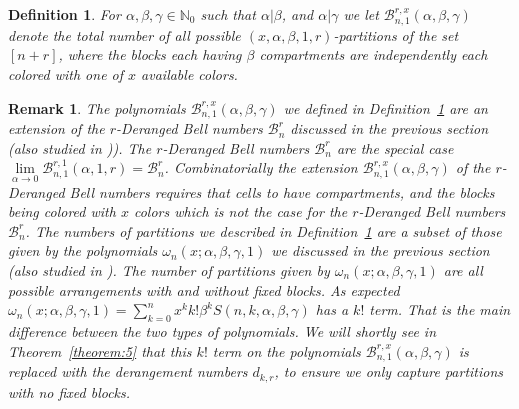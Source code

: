 \documentclass[12pt]{amsart}
\newtheorem{proof 1}{proof 1}
\newtheorem{remark}{Remark}[section]
\newtheorem{definition}{Definition}[section]
\begin{document}
\begin{definition}\label{definition:5}For $\alpha,\beta,\gamma\in\mathbb{N}_0$ such that $\alpha|\beta$, and $\alpha|\gamma$ we let $\mathcal{B}^{r,x}_{n,1}(\alpha,\beta,\gamma)$ denote the total number of all possible  $(x,\alpha,\beta,1,r)$-partitions of the set $[n+r]$, where the blocks 	each having $\beta$ compartments are independently each colored with one of $x$ available colors.  
\end{definition}
\begin{remark}The polynomials $\mathcal{B}^{r,x}_{n,1}(\alpha,\beta,\gamma)$ we defined in Definition~\ref{definition:5} are an extension of the $r$-Deranged Bell numbers $\mathcal{B}^{r}_{n}$ discussed in 
the previous section (also studied in \cite{belbachir2023deranged})). The $r$-Deranged Bell numbers $\mathcal{B}^{r}_{n}$ are the special case $\lim\limits_{\alpha\rightarrow0}\mathcal{B}^{r,1}_{n,1}(\alpha,1,r)=\mathcal{B}^{r}_{n}$. Combinatorially the extension $\mathcal{B}^{r,x}_{n,1}(\alpha,\beta,\gamma)$ of the $r$-Deranged Bell numbers requires that cells to have compartments, and the blocks being colored with $x$ colors which is not the case for the $r$-Deranged Bell numbers $\mathcal{B}^{r}_{n}$. The numbers of partitions we described in Definition~\ref{definition:5} are a subset of those given by the polynomials $\omega _n(x;{\alpha}, \beta, \gamma,1)$ we discussed in the previous section (also studied in \cite{kargin2018higher,kargin2019recurrences}). The number of partitions given by $\omega _n(x;{\alpha}, \beta, \gamma,1)$ are all possible arrangements with and without fixed blocks. As expected $\omega _n(x;{\alpha}, \beta, \gamma,1)=\sum\limits_{k=0}^{n}x^kk!\beta^k S(n,k,\alpha,\beta,\gamma)$ has a $k!$ term. That is the main difference between the two types of polynomials. We will shortly see in Theorem~\ref{theorem:5} that this $k!$ term on the polynomials $\mathcal{B}^{r,x}_{n,1}(\alpha,\beta,\gamma)$ is replaced with the derangement numbers $d_{k,r}$, to ensure we only capture partitions with no fixed blocks.
\end{remark}
\end{document}
